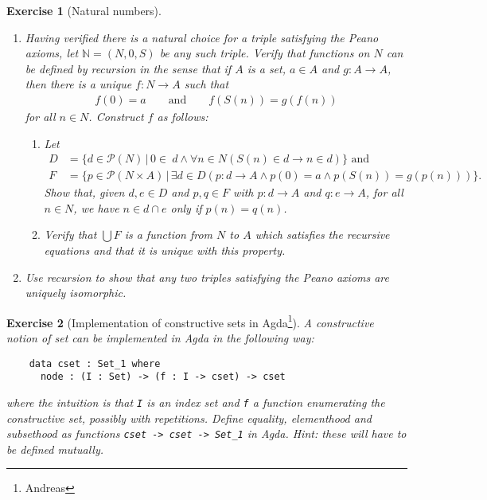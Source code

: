 \documentclass{scrartcl}
\theoremstyle{definition}
\theoremstyle{plain}
\theoremstyle{remark}
\newcommand{\N}{\ensuremath{\mathbb{N}}}
\newcommand{\limp}{\rightarrow}
\newcommand{\Pow}{\mathcal{P}}
\newcommand{\sep}{\,|\,}
\theoremstyle{plain}
\newtheorem{Exc}{Exercise}
\begin{document}
\begin{Exc}[Natural numbers\label{exc:nat}]
\begin{enumerate}
\begin{enumerate}
    \end{enumerate}
  \item Having verified there is a natural choice for a triple satisfying the Peano axioms, let $\N = (N,0,S)$ be any such triple. Verify that functions on $N$ can be defined by recursion in the sense that if $A$ is a set, $a \in A$ and $g : A \longrightarrow A$, then there is a unique $f : N \longrightarrow A$ such that
    \begin{align*}
      f(0) = a
      \qquad \text{and} \qquad
      f(S(n)) = g(f(n))
    \end{align*}
    for all $n \in N$. Construct $f$ as follows:
    \begin{enumerate}
    \item Let
      \begin{align*}
        D &= \{d \in \Pow(N) \sep 0 \in\ d \land \forall n \in N (S(n) \in d \limp n \in d)\}\text{ and}\\
        F &= \{p \in \Pow(N \times A) \sep \exists d \in D (p : d \longrightarrow A \land p(0) = a \land p(S(n)) = g(p(n)))\}\mbox{.}
      \end{align*}
      Show that, given $d,e \in D$ and $p,q \in F$ with $p : d \longrightarrow A$ and $q : e \longrightarrow A$, for all $n \in N$, we have $n \in d \cap e$ only if $p(n) = q(n)$.
    \item Verify that $\bigcup F$ is a function from $N$ to $A$ which satisfies the recursive equations and that it is unique with this property.
    \end{enumerate}
  \item Use recursion to show that any two triples satisfying the Peano axioms are uniquely isomorphic.
  \end{enumerate}
\end{Exc}
\pagebreak
\begin{Exc}[Implementation of constructive sets in Agda\footnote{Andreas}]
  A constructive notion of set can be implemented in Agda in the following way:
  \begin{verbatim}
    data cset : Set_1 where
      node : (I : Set) -> (f : I -> cset) -> cset
  \end{verbatim}
  where the intuition is that \verb|I| is an index set and \verb|f| a function enumerating the constructive set, possibly with repetitions. Define equality, elementhood and subsethood as functions \verb|cset -> cset -> Set_1| in Agda. Hint: these will have to be defined mutually.
\end{Exc}



\end{document}
